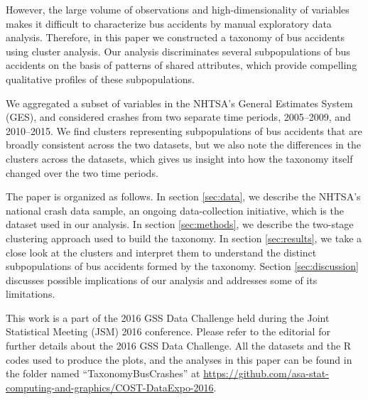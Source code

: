However, the large volume of observations and high-dimensionality of
variables makes it difficult to characterize bus accidents by manual
exploratory data analysis. Therefore, in this paper we constructed a
taxonomy of bus accidents using cluster analysis. Our analysis
discriminates several subpopulations of bus accidents on the basis of patterns of shared
attributes, which provide compelling qualitative profiles of these subpopulations.

We aggregated a subset of variables in the NHTSA's General Estimates
System (GES), and considered crashes from two separate time periods,
2005--2009, and 2010--2015. We find clusters representing
subpopulations of bus accidents that are broadly consistent across the
two datasets, but we also note the differences in the clusters across
the datasets, which gives us insight into how the taxonomy itself
changed over the two time periods.

The paper is organized as follows. In section \ref{sec:data}, 
we describe the NHTSA's national crash data sample, an ongoing data-collection
initiative, which is the dataset used in our analysis.
In section \ref{sec:methods}, we describe the two-stage clustering approach
used to build the taxonomy. In section \ref{sec:results}, we 
take a close look at the clusters and interpret them to understand the 
distinct subpopulations of bus accidents formed by the taxonomy. Section \ref{sec:discussion}
discusses possible implications of our analysis and addresses some of its limitations.

This work is a part of the 2016 GSS Data Challenge held during the Joint Statistical Meeting (JSM) 2016 conference. Please refer to the editorial \citep{gss} for further details about the 2016 GSS Data Challenge.  All the datasets and the R codes used to produce the plots, and the analyses in this paper can be found in the folder named ``TaxonomyBusCrashes'' at  \url{https://github.com/asa-stat-computing-and-graphics/COST-DataExpo-2016}.